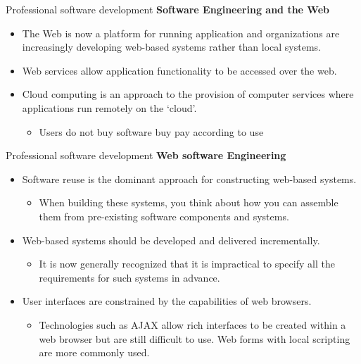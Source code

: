 \documentclass{beamer}
\begin{document}
\begin{frame}{{Professional software development}}
	\textbf{Software Engineering and the Web}
	\begin{itemize}
		\item The Web is now a platform for running application and organizations are increasingly developing web-based systems rather than local systems.
		\item Web services allow application functionality to be accessed over the web.
		\item Cloud computing is an approach to the provision of computer services where applications run remotely on the ‘cloud’. 
		
		\begin{itemize}
			\item Users do not buy software buy pay according to use
			
	
		\end{itemize}

	\end{itemize}
\end{frame}
\begin{frame}{{Professional software development}}
	\textbf{Web software Engineering}
	\begin{itemize}
			\item Software reuse is the dominant approach for constructing web-based systems. 	
		\begin{itemize}
			\item When building these systems, you think about how you can assemble them from pre-existing software components and systems.
		\end{itemize}
		\item Web-based systems should be developed and delivered incrementally.
		\begin{itemize}
			\item It is now generally recognized that it is impractical to specify all the requirements for such systems in advance. 
		\end{itemize}
		\item User interfaces are constrained by the capabilities of web browsers. 
		\begin{itemize}
			\item Technologies such as AJAX allow rich interfaces to be created within a web browser but are still difficult to use. Web forms with local scripting are more commonly used. 
		\end{itemize}
	\end{itemize}
\end{frame}
\end{document}
